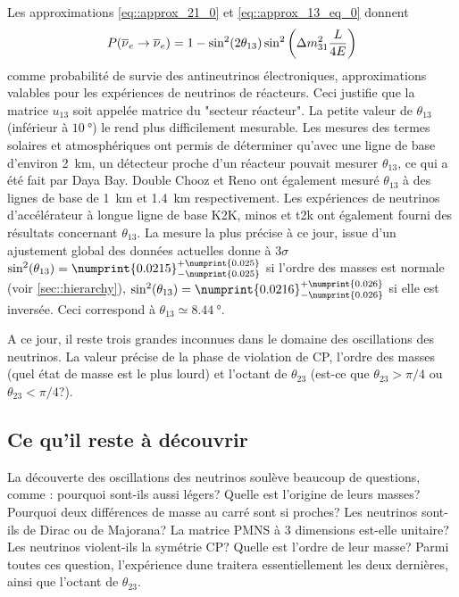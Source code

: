       Les approximations \eqref{eq::approx_21_0} et \eqref{eq::approx_13_eq_0} donnent
      \begin{equation}\label{eq::e_approx_reacteur}
        P(\overline{\nu}_e\to\overline{\nu}_e) = 1-\sin^2(2\theta_{13})\sin^2\left(\Delta m^2_{31}\frac{L}{4E}\right)
      \end{equation}
      comme probabilité de survie des antineutrinos électroniques, approximations valables pour les expériences de neutrinos de réacteurs. Ceci justifie que la matrice $u_{13}$ soit appelée matrice du "secteur réacteur". La petite valeur de $\theta_{13}$ (inférieur à $\SI{10}{\degree}$) le rend plus difficilement mesurable. Les mesures des termes solaires et atmosphériques ont permis de déterminer qu'avec une ligne de base d'environ \SI{2}{\kilo\meter}, un détecteur proche d'un réacteur pouvait mesurer $\theta_{13}$, ce qui a été fait par Daya Bay\cite{An2014}. Double Chooz\cite{Crespo-Anadon2014} et Reno\cite{Collaboration2010} ont également mesuré $\theta_{13}$ à des lignes de base de \SI{1}{\kilo\meter} et \SI{1.4}{\kilo\meter} respectivement. Les expériences de neutrinos d'accélérateur à longue ligne de base K2K\cite{Collaboration2006a}, \gls{minos}\cite{Collaboration2014} et \gls{t2k}\cite{Abe2018} ont également fourni des résultats concernant $\theta_{13}$. La mesure la plus précise à ce jour, issue d'un ajustement global des données actuelles donne à $3\sigma$ $\sin^2(\theta_{13})=\numprint{0.0215}^{+\numprint{0.025}}_{-\numprint{0.025}}$\cite{pdg2018} si l'ordre des masses est normale (voir \autoref{sec::hierarchy}), $\sin^2(\theta_{13})=\numprint{0.0216}^{+\numprint{0.026}}_{-\numprint{0.026}}$ si elle est inversée. Ceci correspond à $\theta_{13}\simeq\SI{8.44}{\degree}$.

    A ce jour, il reste trois grandes inconnues dans le domaine des oscillations des neutrinos. La valeur précise de la phase de violation de CP, l'ordre des masses (quel état de masse est le plus lourd) et l'octant de $\theta_{23}$ (est-ce que $\theta_{23}>\pi/4$ ou $\theta_{23}<\pi/4$?).

    \subsection{Ce qu'il reste à découvrir}\label{sec::a_decouvrir}

      La découverte des oscillations des neutrinos soulève beaucoup de questions, comme : pourquoi sont-ils aussi légers? Quelle est l'origine de leurs masses? Pourquoi deux différences de masse au carré sont si proches? Les neutrinos sont-ils de Dirac ou de Majorana? La matrice PMNS à 3 dimensions est-elle unitaire? Les neutrinos violent-ils la symétrie CP? Quelle est l'ordre de leur masse? Parmi toutes ces question, l'expérience \gls{dune} traitera essentiellement les deux dernières, ainsi que l'octant de $\theta_{23}$.

